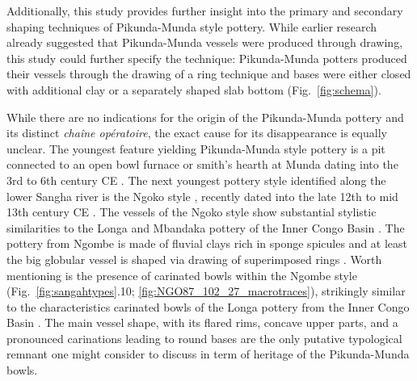 \documentclass[smallextended,natbib]{svjour3}       %
\begin{document}
Additionally, this study provides further insight into the primary and secondary shaping techniques of Pikunda-Munda style pottery. While earlier research \citep[47--51 Fig.~13,69--73]{Seidensticker.2021e} already suggested that Pikunda-Munda vessels were produced through drawing, this study could further specify the technique: Pikunda-Munda potters produced their vessels through the drawing of a ring technique and bases were either closed with additional clay or a separately shaped slab bottom (Fig.~\ref{fig:schema}).


While there are no indications for the origin of the Pikunda-Munda pottery and its distinct \textit{chaîne opératoire}, the exact cause for its disappearance is equally unclear. The youngest feature yielding Pikunda-Munda style pottery is a pit connected to an open bowl furnace or smith's hearth at Munda dating into the 3rd to 6th century CE \citep[335--339 Fig.~170]{Seidensticker.2021e}. The next youngest pottery style identified along the lower Sangha river is the Ngoko style \citep[Fig.~\ref{fig:timeslicemaps};][125--128]{Seidensticker.2021e}, recently dated into the late 12th to mid 13th century CE \citep[Tab.~2: RICH-30864]{Seidensticker.2024}. The vessels of the Ngoko style show substantial stylistic similarities to the Longa and Mbandaka pottery of the Inner Congo Basin \citep[121--128,139--143]{Wotzka.1995}. The pottery from Ngombe is made of fluvial clays rich in sponge spicules \citep{Seidensticker.2020} and at least the big globular vessel is shaped via drawing of superimposed rings \citep[Fig.~\ref{fig:NGO87_102_27_macrotraces}--\ref{fig:NGO87_102_28-29_macrotraces};][52--53 Fig.~15]{Seidensticker.2021e}. Worth mentioning is the presence of carinated bowls within the Ngombe style (Fig.~\ref{fig:sangahtypes}.10; \ref{fig:NGO87_102_27_macrotraces}), strikingly similar to the characteristics carinated bowls of the Longa pottery from the Inner Congo Basin \citep[121--128]{Wotzka.1995}. The main vessel shape, with its flared rims, concave upper parts, and a pronounced carinations leading to round bases \citep[197 Fig.~94.1--2]{Seidensticker.2021e} are the only putative typological remnant one might consider to discuss in term of heritage of the Pikunda-Munda bowls.
\end{document}
